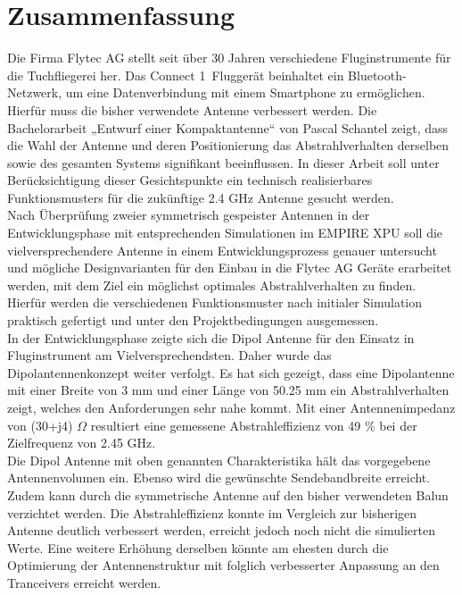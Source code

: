 \newpage
\section*{Zusammenfassung}

Die Firma Flytec AG stellt seit über 30 Jahren verschiedene Fluginstrumente für die Tuchfliegerei her. Das \glqq Connect 1\grqq\ Fluggerät beinhaltet ein Bluetooth-Netzwerk, um eine Datenverbindung mit einem Smartphone zu ermöglichen. Hierfür muss die bisher verwendete Antenne verbessert werden. Die Bachelorarbeit „Entwurf einer Kompaktantenne“ von Pascal Schantel zeigt, dass die Wahl der Antenne und deren Positionierung das Abstrahlverhalten derselben sowie des gesamten Systems signifikant beeinflussen. In dieser Arbeit soll unter Berücksichtigung dieser Gesichtspunkte ein technisch realisierbares Funktionsmusters für die zukünftige 2.4 GHz Antenne gesucht werden.\\
Nach Überprüfung zweier symmetrisch gespeister Antennen in der Entwicklungsphase mit entsprechenden Simulationen im EMPIRE XPU soll die vielversprechendere Antenne in einem  Entwicklungsprozess genauer untersucht und mögliche Designvarianten für den Einbau in die Flytec AG Geräte erarbeitet werden, mit dem Ziel ein möglichst optimales Abstrahlverhalten zu finden. Hierfür werden die verschiedenen Funktionsmuster nach initialer Simulation praktisch gefertigt und unter den Projektbedingungen ausgemessen.\\
In der Entwicklungsphase zeigte sich die Dipol Antenne für den Einsatz in Fluginstrument am Vielversprechendsten. Daher wurde das Dipolantennenkonzept weiter verfolgt. Es hat sich gezeigt, dass eine Dipolantenne mit einer Breite von 3 mm und einer Länge von 50.25 mm ein Abstrahlverhalten zeigt, welches den Anforderungen sehr nahe kommt. Mit einer Antennenimpedanz von (30+j4) $\Omega$ resultiert eine gemessene Abstrahleffizienz von 49 $\%$ bei der Zielfrequenz von 2.45 GHz. \\
Die Dipol Antenne mit oben genannten Charakteristika hält das vorgegebene Antennenvolumen ein. Ebenso wird die gewünschte Sendebandbreite erreicht. Zudem kann durch die symmetrische Antenne auf den bisher verwendeten Balun verzichtet werden. Die Abstrahleffizienz konnte im Vergleich zur bisherigen Antenne deutlich verbessert werden, erreicht jedoch noch nicht die simulierten Werte. Eine weitere Erhöhung derselben könnte am ehesten durch die Optimierung der Antennenstruktur mit folglich verbesserter Anpassung an den Tranceivers erreicht werden. 



